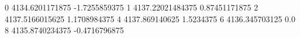 0 4134.6201171875 -1.7255859375
1 4137.22021484375 0.87451171875
2 4137.5166015625 1.1708984375
4 4137.869140625 1.5234375
6 4136.345703125 0.0
8 4135.8740234375 -0.4716796875
